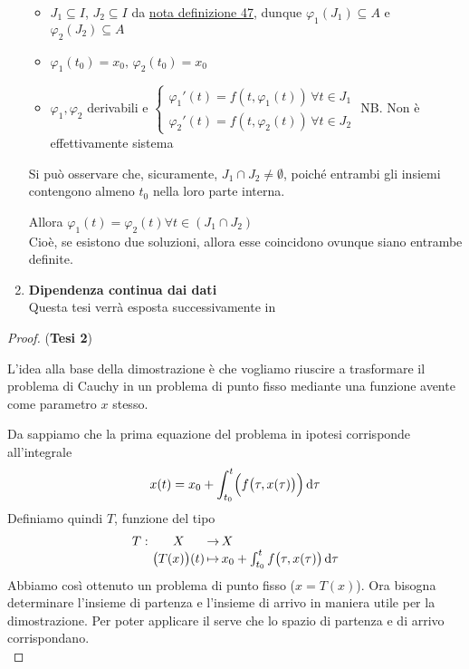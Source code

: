 \begin{theorem}
\begin{enumerate}
		\begin{itemize}
			\item $J_1\subseteq I$, $J_2\subseteq I$ da \hyperlink{note:diff_eq_sol_definit_set}{nota definizione 47}, dunque $\varphi_1(J_1)\subseteq A$ e $\varphi_2(J_2)\subseteq A$
			\item $\varphi_1(t_0)=x_0,\,\varphi_2(t_0)=x_0$
			\item $\varphi_1,\varphi_2$ derivabili e
				$\begin{cases}
					\varphi_1'(t)=f(t,\varphi_1(t))\,\forall t \in J_1\\
					\varphi_2'(t)=f(t,\varphi_2(t))\,\forall t \in J_2
				\end{cases}$
				NB. Non è effettivamente sistema
		\end{itemize}
		\begin{note}
			Si può osservare che, sicuramente, $J_1\cap J_2\neq\emptyset$, poiché entrambi gli insiemi contengono almeno $t_0$ nella loro parte interna.
		\end{note}
		Allora $\varphi_1(t)=\varphi_2(t)$\quad$\forall t \in(J_1\cap J_2)$\\
		Cioè, se esistono due soluzioni, allora esse coincidono ovunque siano entrambe definite.
		\item \textbf{Dipendenza continua dai dati}\\
		Questa tesi verrà esposta successivamente in 
	\end{enumerate}
	\begin{proof}(\textbf{Tesi 2})
		\begin{note}
			L'idea alla base della dimostrazione è che vogliamo riuscire a trasformare il problema di Cauchy in un problema di punto fisso mediante una funzione avente come parametro $x$ stesso.
		\end{note}
		Da  sappiamo che la prima equazione del problema in ipotesi corrisponde all'integrale
		$$x(t)=x_0+\int_{t_0}^{t}\Bigl(f\bigl(\tau,x(\tau)\bigr)\Bigr)\,\mathrm{d}{\tau}$$
		Definiamo quindi $T$, funzione del tipo
		\begin{equation}
			\label{eq:cauch_proof_T}
			\funcdef{\textrm{$T$}}{\bigl(T(x)\bigr)(t)}{X}[x_0+\int_{t_0}^tf\bigl(\tau,x(\tau)\bigr)\integrald{\tau}]
		\end{equation}
		Abbiamo così ottenuto un problema di punto fisso ($x=T(x)$). Ora bisogna determinare l'insieme di partenza e l'insieme di arrivo in maniera utile per la dimostrazione. Per poter applicare il  serve che lo spazio di partenza e di arrivo corrispondano.\\

\end{proof}
\end{theorem}
